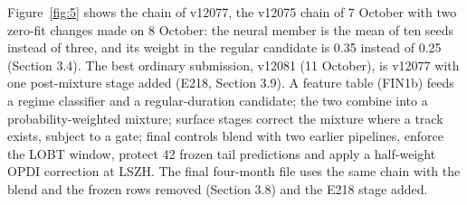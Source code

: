 \documentclass[11pt,a4paper]{article}
\begin{document}
Figure~\ref{fig:5} shows the chain of v12077, the v12075 chain of 7 October with two zero-fit changes made on 8 October: the neural member is the mean of ten seeds instead of three, and its weight in the regular candidate is 0.35 instead of 0.25 (Section 3.4). The best ordinary submission, v12081 (11 October), is v12077 with one post-mixture stage added (E218, Section 3.9). A feature table (FIN1b) feeds a regime classifier and a regular-duration candidate; the two combine into a probability-weighted mixture; surface stages correct the mixture where a track exists, subject to a gate; final controls blend with two earlier pipelines, enforce the LOBT window, protect 42 frozen tail predictions and apply a half-weight OPDI correction at LSZH. The final four-month file uses the same chain with the blend and the frozen rows removed (Section 3.8) and the E218 stage added.
\end{document}
